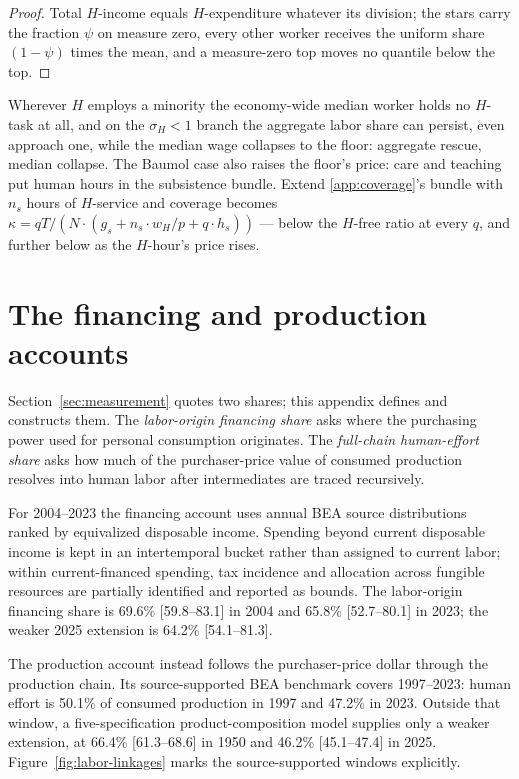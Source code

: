 \documentclass[12pt]{article}
\theoremstyle{plain}
\begin{document}
\begin{proof}
Total $H$-income equals $H$-expenditure whatever its division; the stars carry the fraction $\psi$ on measure zero, every other worker receives the uniform share $(1-\psi )$ times the mean, and a measure-zero top moves no quantile below the top.
\end{proof}

Wherever $H$ employs a minority the economy-wide median worker holds no $H$-task at all, and on the $\sigma _H < 1$ branch the aggregate labor share can persist, even approach one, while the median wage collapses to the floor: aggregate rescue, median collapse. The Baumol case also raises the floor's price: care and teaching put human hours in the subsistence bundle. Extend \ref{app:coverage}'s bundle with $n_s$ hours of $H$-service and coverage becomes $\kappa = qT/(N\cdot (g_s + n_s\cdot w_H/p + q\cdot h_s))$ --- below the $H$-free ratio at every $q$, and further below as the $H$-hour's price rises.

\section{The financing and production accounts}\label{app:effort}

Section~\ref{sec:measurement} quotes two shares; this appendix defines and constructs them. The \emph{labor-origin financing share} asks where the purchasing power used for personal consumption originates. The \emph{full-chain human-effort share} asks how much of the purchaser-price value of consumed production resolves into human labor after intermediates are traced recursively.

For 2004--2023 the financing account uses annual BEA source distributions ranked by equivalized disposable income. Spending beyond current disposable income is kept in an intertemporal bucket rather than assigned to current labor; within current-financed spending, tax incidence and allocation across fungible resources are partially identified and reported as bounds. The labor-origin financing share is 69.6\% [59.8--83.1] in 2004 and 65.8\% [52.7--80.1] in 2023; the weaker 2025 extension is 64.2\% [54.1--81.3].

The production account instead follows the purchaser-price dollar through the production chain. Its source-supported BEA benchmark covers 1997--2023: human effort is 50.1\% of consumed production in 1997 and 47.2\% in 2023. Outside that window, a five-specification product-composition model supplies only a weaker extension, at 66.4\% [61.3--68.6] in 1950 and 46.2\% [45.1--47.4] in 2025. Figure~\ref{fig:labor-linkages} marks the source-supported windows explicitly.
\end{document}
